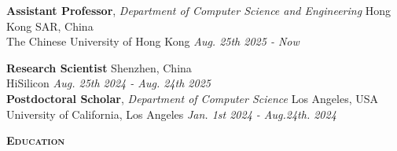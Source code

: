 \documentclass[a4paper]{article}
\newenvironment{changemargin}[2]{%
  \begin{list}{}{%
    \setlength{\topsep}{0pt}%
    \setlength{\leftmargin}{#1}%
    \setlength{\rightmargin}{#2}%
    \setlength{\listparindent}{\parindent}%
    \setlength{\itemindent}{\parindent}%
    \setlength{\parsep}{\parskip}%
  }%
  \item[]}{\end{list}
}
\newcommand{\lineover}{
	\begin{changemargin}{-0.05in}{-0.05in}
		\vspace*{-8pt}
		\hrulefill \\
		\vspace*{-2pt}
	\end{changemargin}
}
\newcommand{\header}[1]{
	\begin{changemargin}{-0.5in}{-0.5in}
		\scshape{\large \textbf{#1}}\\
  	\lineover
	\end{changemargin}
}
\newenvironment{body} {
	\vspace*{-16pt}
	\begin{changemargin}{-0.5in}{-0.5in}
  }	
	{\end{changemargin}
}
\begin{document}
\begin{body}
	\vspace{14pt}

	\textbf{Assistant Professor}, \emph{Department of Computer Science and Engineering} \hfill Hong Kong SAR, China \\
The Chinese University of Hong Kong \hfill \emph{Aug. 25th 2025 - Now} {} \\

\vspace{6pt}

	\textbf{Research Scientist} \hfill Shenzhen, China \\
HiSilicon \hfill \emph{Aug. 25th 2024 - Aug. 24th 2025} {} \\

\vspace{6pt}
	\textbf{Postdoctoral Scholar}, \emph{Department of Computer Science} \hfill Los Angeles, USA \\
University of California, Los Angeles \hfill \emph{Jan. 1st 2024 - Aug.24th. 2024}{} \\

\end{body}

\smallskip
\smallskip



\header{Education}
\end{document}
